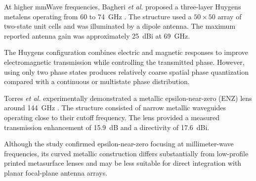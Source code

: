 At higher mmWave frequencies, Bagheri \textit{et al.} proposed a
three-layer Huygens metalens operating from 60 to 74~GHz
\cite{Bagheri2023}. The structure used a $50\times50$ array of
two-state unit cells and was illuminated by a dipole antenna. The
maximum reported antenna gain was approximately 25~dBi at 69~GHz.

The Huygens configuration combines electric and magnetic responses to
improve electromagnetic transmission while controlling the
transmitted phase. However, using only two phase states produces
relatively coarse spatial phase quantization compared with a
continuous or multistate phase distribution.

Torres \textit{et al.} experimentally demonstrated a metallic
epsilon-near-zero (ENZ) lens around 144~GHz
\cite{Torres2015}. The structure consisted of narrow metallic
waveguides operating close to their cutoff frequency. The lens
provided a measured transmission enhancement of 15.9~dB and a
directivity of 17.6~dBi.

Although the study confirmed epsilon-near-zero focusing at
millimeter-wave frequencies, its curved metallic construction differs
substantially from low-profile printed metasurface lenses and may be
less suitable for direct integration with planar focal-plane antenna
arrays.


